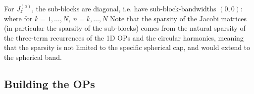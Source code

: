 For $J_z^{(a)}$, the sub-blocks are diagonal, i.e. have sub-block-bandwidths $(0,0)$:
where for $k = 1,\dots,N, \: n = k,\dots,N$
Note that the sparsity of the Jacobi matrices (in particular the sparsity of the sub-blocks) comes from the natural sparsity of the three-term recurrences of the 1D OPs and the circular harmonics, meaning that the sparsity is not limited to the specific spherical cap, and would extend to the spherical band.


\subsection{Building the OPs} 

